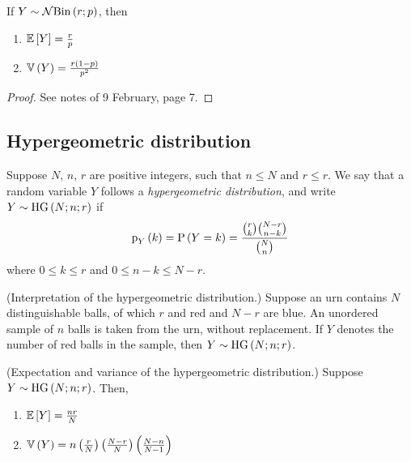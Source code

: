 \documentclass[11pt]{article}
\begin{document}
\begin{thm}
    If $Y \sim \operatorname{\mathcal{N}Bin}\left(r;p\right)$, then
    \begin{enumerate}
        \item $\operatorname{\mathbb{E}}{\left[Y\right]} = \frac{r}{p}$
        \item $\operatorname{\mathbb{V}}{\left(Y\right)} = \frac{r(1-p)}{p^2}$
    \end{enumerate}
\end{thm}

\begin{proof}
    See notes of 9 February, page 7.
\end{proof}

\subsection{Hypergeometric distribution}

\begin{defn}
    Suppose $N$, $n$, $r$ are positive integers,
    such that $n \leq N$ and $r \leq r$.
    We say that a random variable $Y$
    follows a \emph{hypergeometric distribution},
    and write $Y \sim \operatorname{HG}\left(N;n;r\right)$ if
    \begin{equation}
        \label{eq:hypergeomtric-distribution}
        \p[Y]{k}
        = \P{Y = k}
        = \frac{\binom{r}{k} \binom{N - r}{n - k}}{
            \binom{N}{n}
        }
    \end{equation}
    where $0 \leq k \leq r$
    and $0 \leq n - k \leq N - r$.
\end{defn}

\begin{rem}{(Interpretation of the hypergeometric distribution.)}
    Suppose an urn contains $N$ distinguishable balls,
    of which $r$ and red and $N - r$ are blue.
    An unordered sample of $n$ balls is taken from the urn,
    without replacement.
    If $Y$ denotes the number of red balls in the sample,
    then $Y \sim \operatorname{HG}\left(N;n;r\right)$.
\end{rem}

\begin{thm}{(Expectation and variance of the hypergeometric distribution.)}
    Suppose $Y \sim \operatorname{HG}\left(N;n;r\right)$.
    Then,
    \begin{enumerate}
        \item $\operatorname{\mathbb{E}}{\left[Y\right]} = \frac{nr}{N}$
        \item $
            \operatorname{\mathbb{V}}{\left(Y\right)}
            = n
            \left(\frac{r}{N}\right)
            \left(\frac{N-r}{N}\right)
            \left(\frac{N-n}{N-1}\right)
            $
    \end{enumerate}
\end{thm}
\end{document}
